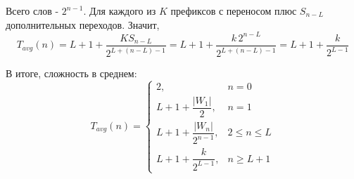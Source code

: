 \documentclass[12pt]{article}
\begin{document}
Всего слов - $2^{n-1}$.
Для каждого из $K$ префиксов с переносом плюс $S_{n-L}$
дополнительных переходов. Значит,
\[
T_{avg}(n)
=L+1+\frac{KS_{n-L}}{2^{L+(n-L)-1}}
=L+1+\frac{k\,2^{n-L}}{2^{L+(n-L)-1}}
=L+1+\frac{k}{2^{L-1}}
\]

В итоге, сложность в среднем:
\[
T_{avg}(n)=
\begin{cases}
2, & n=0\\
L+1+\dfrac{|W_1|}{2}, & n=1\\
L+1+\dfrac{|W_n|}{2^{n-1}}, & 2\leq n\leq L\\
L+1+\dfrac{k}{2^{L-1}}, & n\geq L+1
\end{cases}
\]
\end{document}
